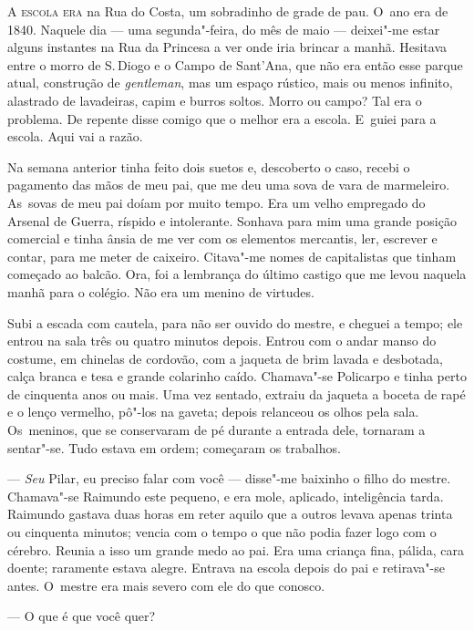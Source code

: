\begin{linenumbers}

\textsc{A escola era} na Rua do Costa, um sobradinho de grade de pau. O~ano era
de 1840. Naquele dia --- uma segunda"-feira, do mês de maio --- deixei"-me
estar alguns instantes na Rua da Princesa a ver onde iria brincar a
manhã. Hesitava entre o morro de S.\,Diogo e o Campo de Sant'Ana, que não
era então esse parque atual, construção de \emph{gentleman}, mas um
espaço rústico, mais ou menos infinito, alastrado de lavadeiras, capim e
burros soltos. Morro ou campo? Tal era o problema. De repente disse
comigo que o melhor era a escola. E~guiei para a escola. Aqui vai a
razão.

Na semana anterior tinha feito dois suetos e, descoberto o caso, recebi
o pagamento das mãos de meu pai, que me deu uma sova de vara de
marmeleiro. As~sovas de meu pai doíam por muito tempo. Era um velho
empregado do Arsenal de Guerra, ríspido e intolerante. Sonhava para mim
uma grande posição comercial e tinha ânsia de me ver com os elementos
mercantis, ler, escrever e contar, para me meter de caixeiro. Citava"-me
nomes de capitalistas que tinham começado ao balcão. Ora, foi a
lembrança do último castigo que me levou naquela manhã para o colégio.
Não era um menino de virtudes.

Subi a escada com cautela, para não ser ouvido do mestre, e cheguei a
tempo; ele entrou na sala três ou quatro minutos depois. Entrou com o
andar manso do costume, em chinelas de cordovão, com a jaqueta de brim
lavada e desbotada, calça branca e tesa e grande colarinho caído.
Chamava"-se Policarpo e tinha perto de cinquenta anos ou mais. Uma vez
sentado, extraiu da jaqueta a boceta de rapé e o lenço vermelho, pô"-los
na gaveta; depois relanceou os olhos pela sala. Os~meninos, que se
conservaram de pé durante a entrada dele, tornaram a sentar"-se. Tudo
estava em ordem; começaram os trabalhos.

--- \emph{Seu} Pilar, eu preciso falar com você --- disse"-me baixinho o
filho do mestre. Chamava"-se Raimundo este pequeno, e era mole, aplicado,
inteligência tarda. Raimundo gastava duas horas em reter aquilo que a
outros levava apenas trinta ou cinquenta minutos; vencia com o tempo o
que não podia fazer logo com o cérebro. Reunia a isso um grande medo ao
pai. Era uma criança fina, pálida, cara doente; raramente estava alegre.
Entrava na escola depois do pai e retirava"-se antes. O~mestre era mais
severo com ele do que conosco.

--- O que é que você quer?


\end{linenumbers}
